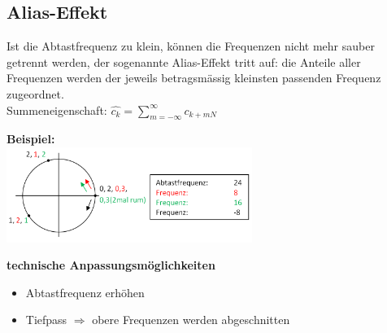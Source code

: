 	
	
	
\subsection{Alias-Effekt}

	Ist die Abtastfrequenz zu klein, k\"onnen die Frequenzen nicht mehr sauber getrennt werden, der sogenannte Alias-Effekt tritt auf:
	die Anteile aller Frequenzen werden der jeweils betragsm\"assig kleinsten passenden Frequenz zugeordnet.\\
	Summeneigenschaft: \qquad $\boxed{\hat{c_k} = \sum\limits_{m=-\infty}^{\infty} c_{k+mN}}$\\
	\begin{minipage}[t]{8.5cm}
        \textbf{Beispiel:}\\
		\includegraphics[width=8cm]{./bilder/Alias-effekt.png}
	\end{minipage}
	\qquad
	\begin{minipage}[t]{10cm}
		\textbf{technische Anpassungsmöglichkeiten}\\
		\begin{itemize}
			\item Abtastfrequenz erhöhen
			\item Tiefpass $\Rightarrow$ obere Frequenzen werden abgeschnitten
		\end{itemize}
	\end{minipage}
	
